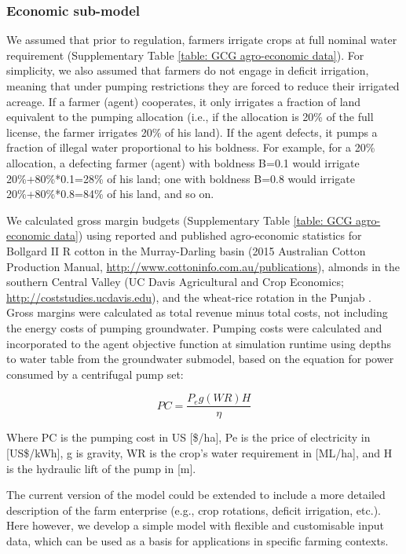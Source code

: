 \documentclass[12pt, a4paper]{article}
\begin{document}
\subsubsection{Economic sub-model}

We assumed that prior to regulation, farmers irrigate crops at full nominal water requirement (Supplementary Table \ref{table: GCG agro-economic data}). For simplicity, we also assumed that farmers do not engage in deficit irrigation, meaning that under pumping restrictions they are forced to reduce their irrigated acreage. If a farmer (agent) cooperates, it only irrigates a fraction of land equivalent to the pumping allocation (i.e., if the allocation is 20\% of the full license, the farmer irrigates 20\% of his land). If the agent defects, it pumps a fraction of illegal water proportional to his boldness. For example, for a 20\% allocation, a defecting farmer (agent) with boldness B=0.1 would irrigate 20\%+80\%*0.1=28\% of his land; one with boldness B=0.8 would irrigate 20\%+80\%*0.8=84\% of his land, and so on. 

We calculated gross margin budgets (Supplementary Table \ref{table: GCG agro-economic data}) using reported and published agro-economic statistics for Bollgard II R cotton in the Murray-Darling basin (2015 Australian Cotton Production Manual, \url{http://www.cottoninfo.com.au/publications}), almonds in the southern Central Valley (UC Davis Agricultural and Crop Economics; \url{http://coststudies.ucdavis.edu}), and the wheat-rice rotation in the Punjab \autocite{Jalota:2007ha, Singh:2009jo}. Gross margins were calculated as total revenue minus total costs, not including the energy costs of pumping groundwater. Pumping costs were calculated and incorporated to the agent objective function at simulation runtime using depths to water table from the groundwater submodel, based on the equation for power consumed by a centrifugal pump set:

\begin{equation}
	PC=\frac{P_{e}g(WR)H}{\eta}
\end{equation}

Where PC is the pumping cost in US [\$/ha], Pe is the price of electricity in [US\$/kWh], g is gravity, WR is the crop’s water requirement in [ML/ha], and H is the hydraulic lift of the pump in [m]. 

The current version of the model could be extended to include a more detailed description of the farm enterprise (e.g., crop rotations, deficit irrigation, etc.). Here however, we develop a simple model with flexible and customisable input data, which can be used as a basis for applications in specific farming contexts. 
\end{document}

